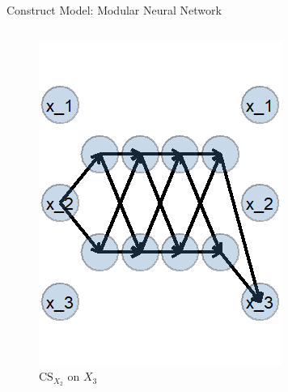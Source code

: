 \documentclass[onlytextwidth,english]{beamer}\usepackage[]{graphicx}\usepackage[]{xcolor}
\begin{document}
\begin{frame}{Construct Model: Modular Neural Network}
\begin{columns}
\begin{column}{0.35\textwidth}
\begin{figure}
  \centering
  \includegraphics[width=0.65\linewidth]{img/CS.png}
  \caption{$\text{CS}_{X_2}$ on $X_3$}
\end{figure}
\end{column}

\end{columns}

\end{frame}


%         
\end{document}
